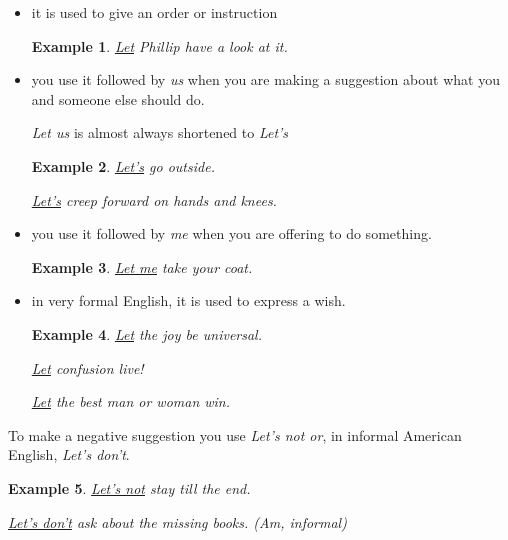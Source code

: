 \documentclass[oneside]{book}
\numberwithin{equation}{section}
\newtheorem{example}{Example}[section]
\begin{document}
\begin{itemize}
    \item it is used to give an order or instruction
    \begin{example}
        \underline{Let} Phillip have a look at it.
    \end{example}
    \item you use it followed by \textit{us} when you are making a suggestion about what you and someone else should do.
    
    \textit{Let us} is almost always shortened to \textit{Let's}
    \begin{example}
        \underline{Let's} go outside.
        
        \underline{Let's} creep forward on hands and knees.
    \end{example}
    \item you use it followed by \textit{me} when you are offering to do something.
    \begin{example}
        \underline{Let me} take your coat.
    \end{example}
    \item in very formal English, it is used to express a wish.
    \begin{example}
        \underline{Let} the joy be universal.
        
        \underline{Let} confusion live!
        
        \underline{Let} the best man or woman win.
    \end{example}
\end{itemize}
To make a negative suggestion you use \textit{Let's not or}, in informal American English, \textit{Let's don't}.
\begin{example}
    \underline{Let's not} stay till the end.
    
    \underline{Let's don't} ask about the missing books. (Am, informal)
\end{example}
\end{document}
